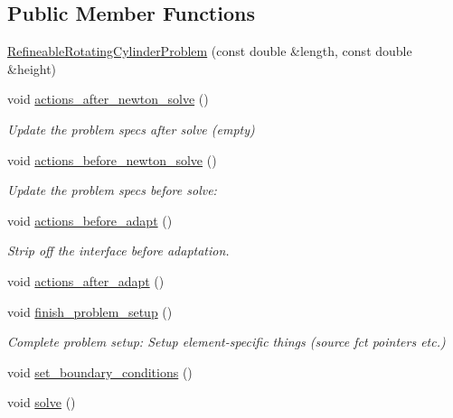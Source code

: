 \subsection*{Public Member Functions}
\begin{DoxyCompactItemize}
\item 
\hyperlink{classRefineableRotatingCylinderProblem_aa597c4240ce9affbd7540998167c8f21}{Refineable\+Rotating\+Cylinder\+Problem} (const double \&length, const double \&height)
\item 
void \hyperlink{classRefineableRotatingCylinderProblem_af559552a0c8cba56b883cd8b5b283b7f}{actions\+\_\+after\+\_\+newton\+\_\+solve} ()
\begin{DoxyCompactList}\small\item\em Update the problem specs after solve (empty) \end{DoxyCompactList}\item 
void \hyperlink{classRefineableRotatingCylinderProblem_a382bc388316b410c45f337558b5ad577}{actions\+\_\+before\+\_\+newton\+\_\+solve} ()
\begin{DoxyCompactList}\small\item\em Update the problem specs before solve\+: \end{DoxyCompactList}\item 
void \hyperlink{classRefineableRotatingCylinderProblem_a705922ef2d96697ea5a110a412db5287}{actions\+\_\+before\+\_\+adapt} ()
\begin{DoxyCompactList}\small\item\em Strip off the interface before adaptation. \end{DoxyCompactList}\item 
void \hyperlink{classRefineableRotatingCylinderProblem_af914476e487ad5ed623384adb7c68c66}{actions\+\_\+after\+\_\+adapt} ()
\item 
void \hyperlink{classRefineableRotatingCylinderProblem_a417d18c2584ed1ea38daefe5dd68b4a4}{finish\+\_\+problem\+\_\+setup} ()
\begin{DoxyCompactList}\small\item\em Complete problem setup\+: Setup element-\/specific things (source fct pointers etc.) \end{DoxyCompactList}\item 
void \hyperlink{classRefineableRotatingCylinderProblem_acd510f2c06fa3f38d2911781656dbf20}{set\+\_\+boundary\+\_\+conditions} ()
\item 
void \hyperlink{classRefineableRotatingCylinderProblem_a664bfd373351a401619b06c3494fdcdc}{solve} ()

\end{DoxyCompactItemize}
